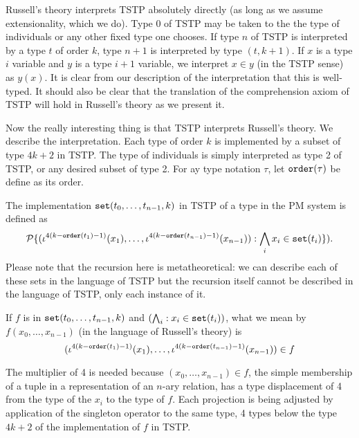 \documentclass[12pt]{article}
\begin{document}
Russell's theory interprets TSTP absolutely directly (as long as we assume extensionality, which we do).  Type 0 of TSTP may be taken to the the type of individuals or any other fixed type one chooses.  If type $n$ of TSTP is interpreted by a type $t$ of order $k$,
type $n+1$ is interpreted by type $(t,k+1)$.  If $x$ is a type $i$ variable and $y$ is a type $i+1$ variable,
we interpret $x\in y$ (in the TSTP sense) as $y(x)$.  It is clear from our description of the interpretation that this is well-typed.  It should also be clear that the translation of the comprehension axiom of TSTP will hold in Russell's theory as we present it.

Now the really interesting thing is that TSTP interprets Russell's theory.  We describe the interpretation.
	Each type of order $k$ is implemented by a subset of type $4k+2$ in TSTP.  The type of individuals is simply interpreted as type 2 of TSTP, or any desired subset of type 2.  For ay type notation $\tau$, let ${\tt order}(\tau)$ be define as its order.

The implementation ${\tt set}(t_0,\ldots,t_{n-1},k)$ in TSTP of a type in the PM system is defined as $${\cal P}\{(\iota^{4(k-{\tt order}(t_1)-1)}(x_1),\ldots,\iota^{4(k-{\tt order}(t_{n-1})-1)}(x_{n-1})):\bigwedge_i x_i \in {\tt set}(t_i)\}).$$  Please note that the recursion here is metatheoretical:  we can describe each of these sets in the language of TSTP but the recursion itself cannot be described in the language of TSTP, only each instance of it.

If $f$ is in ${\tt set}(t_0,\ldots,t_{n-1},k)$ and $(\bigwedge_i:x_i \in {\tt set}(t_i))$, what we mean by
$f(x_0,\ldots,x_{n-1})$ (in the language of Russell's theory) is $$(\iota^{4(k-{\tt order}(t_1)-1)}(x_1),\ldots,\iota^{4(k-{\tt order}(t_{n-1})-1)}(x_{n-1})) \in f$$

The multiplier of 4 is needed because $(x_0,\ldots,x_{n-1})\in f$, the simple membership of a tuple in a representation of an $n$-ary relation, has a type displacement of 4 from the type of the $x_i$ to the type of $f$.  Each projection is being adjusted by application of the singleton operator to the same type, 4 types below the type $4k+2$ of the implementation of $f$ in TSTP.
\end{document}
